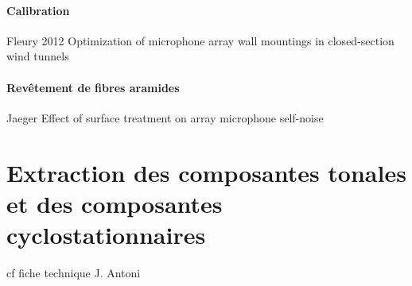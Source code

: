 \paragraph{\tbullet Calibration} Fleury 2012 Optimization of microphone array wall mountings in closed-section wind tunnels

\paragraph{\tbullet Revêtement de fibres aramides} Jaeger Effect of surface treatment on array microphone self-noise


\section{Extraction des composantes tonales et des composantes cyclostationnaires}
cf fiche technique J. Antoni


